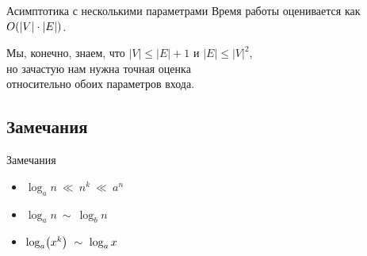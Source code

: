 \begin{frame}{Асимптотика с несколькими параметрами}
	Время работы оценивается как \(O\lr*{ |V| \cdot |E| }\). \bigskip

	Мы, конечно, знаем, что \(|V| \le |E|+1\) и \(|E| \le |V|^2\), \\
	но зачастую нам нужна точная оценка \\
	относительно обоих параметров входа.
\end{frame}

\subsection{Замечания}

\begin{frame}{Замечания}
\begin{itemize}
	\item \( \log_a n\ \ll\ n^k\ \ll\ a^n \) \bigskip
	\item \( \log_a n\ \sim\ \log_b n \) \bigskip
	\item \( \log_a \lr*{x^k}\ \sim\ \log_a x \)
\end{itemize}
\end{frame}
